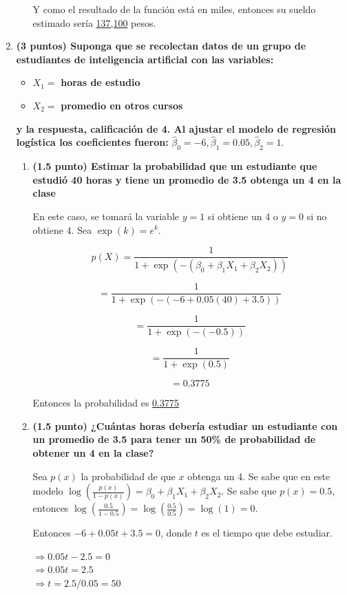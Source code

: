 \documentclass[a4paper,10pt]{article}
\begin{document}
\begin{enumerate}
\begin{enumerate}
Y como el resultado de la función está en miles, entonces su sueldo estimado sería \underline{137,100} pesos.

  \end{enumerate}

  \item \textbf{(3 puntos) Suponga que se recolectan datos de un grupo de estudiantes de inteligencia artificial con las variables:}
  \begin{itemize}
   \item $X_1=$ \textbf{horas de estudio}
   \item $X_2=$ \textbf{promedio en otros cursos}
  \end{itemize}
  \textbf{y la respuesta, calificación de 4. Al ajustar el modelo de regresión logística los coeficientes fueron:} $\hat\beta_0=-6, \hat\beta_1=0.05,\hat\beta_2=1$.
   \begin{enumerate}
    \item \textbf{(1.5 punto) Estimar la probabilidad que un estudiante que estudió 40 horas y tiene un promedio de 3.5 obtenga un 4 en la clase}
    
En este caso, se tomará la variable $y = 1$ si obtiene un 4 o $y = 0$ si no obtiene 4. Sea $\exp(k) = e^k$.

\[p(X) = \frac{1}{1 + \exp (-(\beta_0 + \beta_1 X_1 + \beta_2 X_2))} \]

\[= \frac{1}{1+ \exp (-(-6 +  0.05(40) + 3.5))} \]

\[= \frac{1}{1+ \exp (-(-0.5))} \]

\[= \frac{1}{1+ \exp (0.5)} \]

\[= 0.3775 \]

Entonces la probabilidad es \underline{0.3775}

    \item \textbf{(1.5 punto) ¿Cuántas horas debería estudiar un estudiante con un promedio de 3.5 para tener un 50\% de probabilidad de obtener un 4 en la clase?}
    
Sea $p(x)$ la probabilidad de que $x$ obtenga un 4. Se sabe que en este modelo $\log (\frac{p(x)}{1-p(x)}) = \beta_0 + \beta_1 X_1 + \beta_2 X_2$. Se sabe que $p(x) = 0.5$, entonces $\log (\frac{0.5}{1-0.5}) = \log (\frac{0.5}{0.5}) = \log (1) = 0$.

Entonces $-6 + 0.05t + 3.5 = 0$, donde $t$ es el tiempo que debe estudiar.

$\Rightarrow 0.05t -2.5 = 0$\\
$\Rightarrow 0.05t = 2.5$\\
$\Rightarrow t = 2.5/0.05 = 50$


\end{enumerate}
\end{enumerate}
\end{document}
